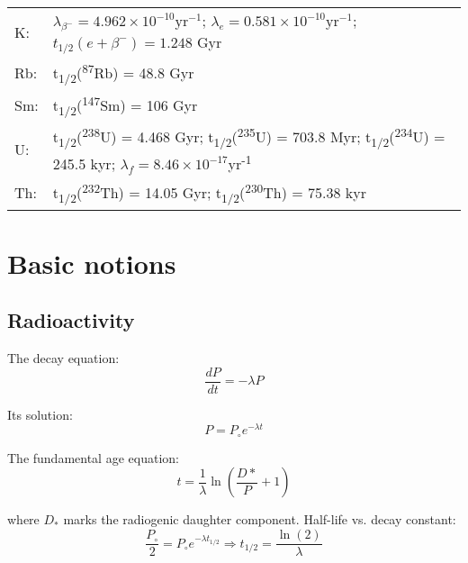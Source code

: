 \documentclass{article}
\begin{document}
\begin{multicols}{3}
\begin{tabular}{p{.03\linewidth}p{.9\linewidth}}
K: & $\lambda_{\beta^-} = 4.962 \times 10^{-10} \mbox{yr}^{-1}$; 
$\lambda_{e} = 0.581 \times 10^{-10} \mbox{yr}^{-1}$;
$t_{1/2}(e+\beta^-)=1.248$ Gyr \\

Rb: & t\textsubscript{1/2}(\textsuperscript{87}Rb) = 48.8 Gyr \\

Sm: & t\textsubscript{1/2}(\textsuperscript{147}Sm) = 106 Gyr \\

U: & t\textsubscript{1/2}(\textsuperscript{238}U) = 4.468 Gyr;
t\textsubscript{1/2}(\textsuperscript{235}U) = 703.8 Myr;
t\textsubscript{1/2}(\textsuperscript{234}U) = 245.5 kyr;
$\lambda_f = 8.46\times{10}^{-17}$yr\textsuperscript{-1}\\

Th: & t\textsubscript{1/2}(\textsuperscript{232}Th) = 14.05 Gyr;
t\textsubscript{1/2}(\textsuperscript{230}Th) = 75.38 kyr \\

\end{tabular}

\section{Basic notions}
\label{ch:basic-notions}

\subsection{Radioactivity}
\label{sec:radioactivity}

The decay equation:
\begin{equation}
\frac{dP}{dt} = -\lambda P
\label{eq:dPdt}
\end{equation}

Its solution:
\begin{equation}
P = P_\circ e^{-\lambda t}
\label{eq:P}
\end{equation}

The fundamental age equation:
\begin{equation}
t = \frac{1}{\lambda} \ln\left(\frac{D*}{P} + 1\right)
\label{eq:t}
\end{equation}

where $D_*$ marks the radiogenic daughter component. Half-life
vs. decay constant:
\begin{equation}
\frac{P_\circ}{2} = P_\circ e^{-\lambda t_{1/2}} 
\Rightarrow t_{1/2} = \frac{\ln(2)}{\lambda}
\label{eq:T12}
\end{equation}


\end{multicols}
\end{document}
